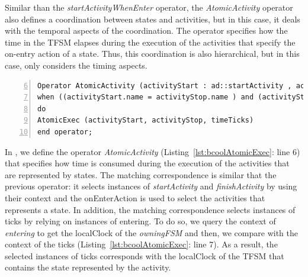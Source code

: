 Similar than the \emph{startActivityWhenEnter} operator, the \emph{AtomicActivity} operator also defines a coordination between states and activities, but in this case, it deals with the temporal aspects of the coordination. The operator specifies how the time in the TFSM elapses during the execution of the activities that specify the on-entry action of a state. Thus, this coordination is also hierarchical, but in this case, only considers the timing aspects. %

\begin{lstlisting}[language=bcool,
caption={Timing Hierarchical operator between TFSM and Activity languages},
label={lst:bcoolAtomicExec}, 
basicstyle=\scriptsize\ttfamily, backgroundcolor=\color{LGrey}, numbers=left, xleftmargin=2pt, firstnumber=6]
Operator AtomicActivity (activityStart : ad::startActivity , activityStop : ad::finishActivity, enterState : tfsm::entering, leaveState : tfsm::leaving, timeTicks : tfsm::ticks)
when ((activityStart.name = activityStop.name ) and (activityStart.name=enterState.OnEnterAction.name ) and (enterState.owningFSM.localClock = timeTicks));
do 
AtomicExec (activityStart, activityStop, timeTicks)
end operator;
\end{lstlisting}

In \bcool, we define the operator \emph{AtomicActivity} (Listing~\ref{lst:bcoolAtomicExec}: line 6) that specifies how time is consumed during the execution of the activities that are represented by states. The matching correspondence is similar that the previous operator: it selects instances of \dse \emph{startActivity} and \emph{finishActivity} by using their context and the onEnterAction is used to select the activities that represents a state. In addition, the matching correspondence selects instances of \dse ticks by relying on instances of \dse entering. To do so, we query the context of \dse \emph{entering} to get the localClock of the \emph{owningFSM} and then, we compare with the context of the \dse ticks (Listing~\ref{lst:bcoolAtomicExec}: line 7). As a result, the selected instances of \dse ticks corresponds with the localClock of the TFSM that contains the state represented by the activity. 

